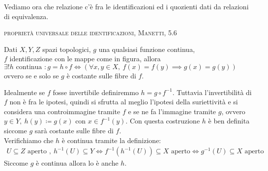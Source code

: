 Vediamo ora che relazione c'è fra le identificazioni ed i quozienti dati da relazioni di equivalenza.
\begin{theorema} \textsc{proprietà universale delle identificazioni, Manetti, 5.6} \\
	\begin{minipage}[t]{0.83\textwidth}
		Dati $X,Y,Z$ spazi topologici, $g$ una qualsiasi funzione continua, \\
		$f$ identificazione con le mappe come in figura, allora \\
		$\exists ! h \text{ continua } \colon g=h\circ f \iff \left( \forall x,y\in X, \ f(x)=f(y)\implies g(x)=g(y)  \right)$ \\
		ovvero se e solo se $g$ è costante sulle fibre di $f$.
	\end{minipage}
	\begin{minipage}[t]{0.13\textwidth}\vspace{-10pt}
	\end{minipage}
\end{theorema}
\begin{demonstration}
	Idealmente se $f$ fosse invertibile definiremmo $h=g\circ f^{-1}$. Tuttavia l'invertibilità di $f$ non è fra le ipotesi, quindi si sfrutta al meglio l'ipotesi della suriettività e si considera una controimmagine tramite $f$ e se ne fa l'immagine tramite $g$, ovvero $y\in Y, \ h(y)\coloneqq g(x)$ con $x\in f^{-1}(y)$. Con questa costruzione $h$ è ben definita siccome $g$ sarà costante sulle fibre di $f$. \\
	Verifichiamo che $h$ è continua tramite la definizione:
		\begin{gather*}
			U\subseteq Z \text{ aperto }, \ h^{-1}(U)\subseteq Y \iff f^{-1}(h^{-1}(U))\subseteq X \text{ aperto} \iff g^{-1}(U)\subseteq X \text{ aperto}
		\end{gather*}
	Siccome $g$ è continua allora lo è anche $h$.
\end{demonstration}

